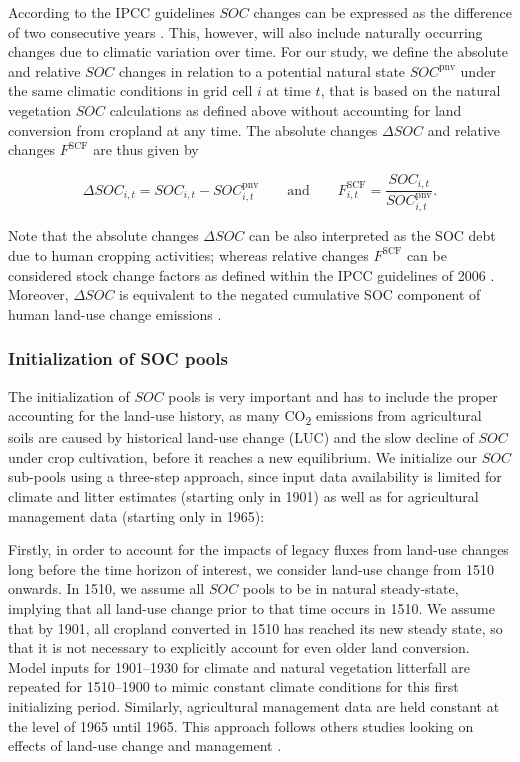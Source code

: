 \documentclass[gc, manuscript]{copernicus}
\begin{document}
According to the IPCC guidelines \(SOC\) changes can be expressed as the difference of two consecutive years \citep[see Eq. 5.0A in][]{ogle_cropland_in_ipcc_2019}. This, however, will also include naturally occurring changes due to climatic variation over time. For our study, we define the absolute and relative \(SOC\) changes in relation to a potential natural state \(SOC^{\mathrm{pnv}}\) under the same climatic conditions in grid cell \(i\) at time \(t\), that is based on the natural vegetation \(SOC\) calculations as defined above without accounting for land conversion from cropland at any time. The absolute changes \(\Delta SOC\) and relative changes \(F^{\mathrm{SCF}}\) are thus given by

\begin{equation}
\Delta SOC_{i,t} = SOC_{i,t} - SOC^{\mathrm{pnv}}_{i,t}\qquad \text{and} \qquad  F^{\mathrm{SCF}}_{i,t} = \frac{SOC_{i,t}}{SOC^{\mathrm{pnv}}_{i,t}} .
\label{eq:stockdiff}
\end{equation}

Note that the absolute changes \(\Delta SOC\) can be also interpreted as the SOC debt \citep{sanderman_soil_2017} due to human cropping activities; whereas relative changes \(F^{\mathrm{SCF}}\) can be considered stock change factors as defined within the IPCC guidelines of 2006 \citep{eggleston_ipcc_2006}. Moreover, \(\Delta SOC\) is equivalent to the negated cumulative SOC component of human land-use change emissions \citep{pugh_simulated_2015}.

\hypertarget{sec:initsoc}{%
\subsubsection{Initialization of SOC pools}\label{sec:initsoc}}

The initialization of \(SOC\) pools is very important and has to include the proper accounting for the land-use history, as many CO\textsubscript{2} emissions from agricultural soils are caused by historical land-use change (LUC) and the slow decline of \(SOC\) under crop cultivation, before it reaches a new equilibrium.
We initialize our \(SOC\) sub-pools using a three-step approach, since input data availability is limited for climate and litter estimates (starting only in 1901) as well as for agricultural management data (starting only in 1965):

Firstly, in order to account for the impacts of legacy fluxes from land-use changes long before the time horizon of interest, we consider land-use change from 1510 onwards. In 1510, we assume all \(SOC\) pools to be in natural steady-state, implying that all land-use change prior to that time occurs in 1510. We assume that by 1901, all cropland converted in 1510 has reached its new steady state, so that it is not necessary to explicitly account for even older land conversion. Model inputs for 1901--1930 for climate and natural vegetation litterfall are repeated for 1510--1900 to mimic constant climate conditions for this first initializing period. Similarly, agricultural management data are held constant at the level of 1965 until 1965. This approach follows others studies looking on effects of land-use change and management \citep[e.g.~][]{schaphoff_lpjml4_2018-1, herzfeld_soc_2021}.
\end{document}

